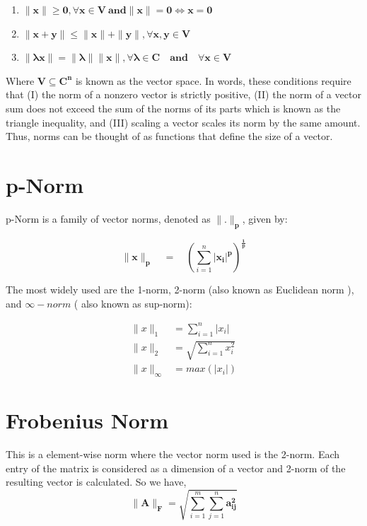 \documentclass[12pt,notitlepage,oneside]{report}
\begin{document}
\begin{enumerate}[label={(\Roman*)}]
	\item  $\pmb{\parallel x \parallel \geq 0, \forall x \in V\ and \parallel x \parallel = 0 \Longleftrightarrow x = 0}$
	\item $ \pmb{\parallel x+y\parallel \leq \parallel x\parallel + \parallel y\parallel , \forall x,y  \in  V } $
	\item $ \pmb{\parallel \lambda x \parallel = \parallel \lambda \parallel \parallel x \parallel , \forall \lambda \in C \quad and \quad \forall x \in V}$
\end{enumerate}

Where $\pmb{V  \subseteq  C^n} $ is known as the vector space. In words, these conditions require that (I) the norm of a nonzero vector is strictly positive, (II) the norm of a vector sum does not exceed the sum of the norms of its parts which is known as the triangle inequality, and (III) scaling a vector scales its norm by the same amount. Thus, norms can be thought of as functions that define the size of a vector.

\section{p-Norm}

p-Norm is a family of vector norms, denoted as $\pmb{ \parallel . \parallel _p }$, given by:


$$\pmb{ \parallel x \parallel _p \quad} = \quad (\sum_{i=1}^{n} \pmb{|x_i|^p})^ {\pmb{\frac{1}{p}}} $$

The most widely used are the 1-norm, 2-norm (also known as Euclidean norm ), and $ \infty-norm$ ( also known as sup-norm):

\begin{align*}
 \parallel x \parallel _1 &= \sum_{i=1}^{n} |x_i| \\
 \parallel x \parallel _2 &= \sqrt{\sum_{i=1}^{n} x_i^2}\\
  \parallel x \parallel _\infty &= max(|x_i|)
\end{align*}

\section{Frobenius Norm}
This is a element-wise norm where the vector norm used is the 2-norm. Each entry of the matrix is considered as a dimension of a vector and 2-norm of the resulting vector is calculated. So we have,
$$ \pmb{\parallel A \parallel _F} = \sqrt{\sum_{i=1}^{m}\sum_{j=1}^{n}\pmb{a_{ij}^2}}$$
\end{document}

